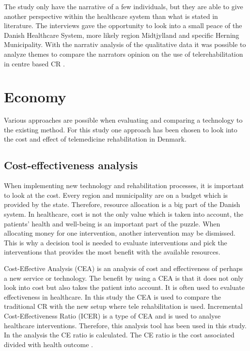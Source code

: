 The study only have the narrative of a few individuals, but they are able to give another perspective within the healthcare system than what is stated in literature. The interviews gave the opportunity to look into a small peace of the Danish Healthcare System, more likely region Midtjylland and specific Herning Municipality. With the narrativ analysis of the qualitative data it was possible to analyze themes to compare the narrators opinion on the use of telerehabilitation in centre based CR \cite{mark2009research}. 

  

\section{Economy}

Various approaches are possible when evaluating and comparing a technology to the existing method. For this study one approach has been chosen to look into the cost and effect of telemedicine rehabilitation in Denmark.

\subsection{Cost-effectiveness analysis}

When implementing new technology and rehabilitation processes, it is important to look at the cost. Every region and municipality are on a budget which is provided by the state. Therefore, resource allocation is a big part of the Danish system. In healthcare, cost is not the only value which is taken into account, the patients’ health and well-being is an important part of the puzzle. When allocating money for one intervention, another intervention may be dismissed. This is why a decision tool is needed to evaluate interventions and pick the interventions that provides the most benefit with the available resources.

Cost-Effective Analysis (CEA) is an analysis of cost and effectiveness of perhaps a new service or technology. The benefit by using a CEA is that it does not only look into cost but also takes the patient into account. It is often used to evaluate effectiveness in healthcare. In this study the CEA is used to compare the traditional CR with the new setup where tele rehabilitation is used. Incremental Cost-Effectiveness Ratio (ICER) is a type of CEA and is used to analyse healthcare interventions. Therefore, this analysis tool has been used in this study. In the analysis the CE ratio is calculated. The CE ratio is the cost associated divided with health outcome \cite{bang2012median}.

